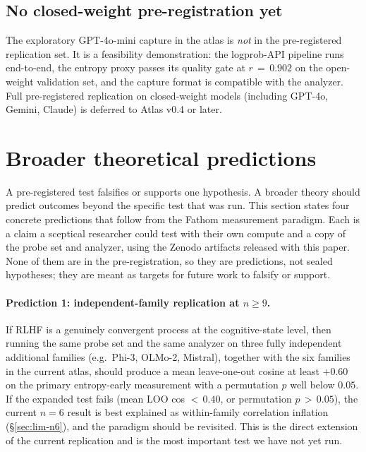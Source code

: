\documentclass[11pt,letterpaper]{article}
\begin{document}
\subsection{No closed-weight pre-registration yet}

The exploratory GPT-4o-mini capture in the atlas is \emph{not} in the
pre-registered replication set. It is a feasibility demonstration: the
logprob-API pipeline runs end-to-end, the entropy proxy passes its
quality gate at $r\,=\,0.902$ on the open-weight validation set, and the
capture format is compatible with the analyzer. Full pre-registered
replication on closed-weight models (including GPT-4o, Gemini, Claude)
is deferred to Atlas v0.4 or later.

\section{Broader theoretical predictions}
\label{sec:predictions}

A pre-registered test falsifies or supports one hypothesis. A broader
theory should predict outcomes beyond the specific test that was run.
This section states four concrete predictions that follow from the
Fathom measurement paradigm. Each is a claim a sceptical researcher
could test with their own compute and a copy of the probe set and
analyzer, using the Zenodo artifacts released with this paper. None of
them are in the pre-registration, so they are predictions, not sealed
hypotheses; they are meant as targets for future work to falsify or
support.

\paragraph{Prediction 1: independent-family replication at $n\!\geq\!9$.}
If RLHF is a genuinely convergent process at the cognitive-state level,
then running the same probe set and the same analyzer on three fully
independent additional families (e.g.\ Phi-3, OLMo-2, Mistral), together
with the six families in the current atlas, should produce a mean
leave-one-out cosine at least $+0.60$ on the primary entropy-early
measurement with a permutation $p$ well below $0.05$. If the expanded
test fails (mean LOO cos $<\,0.40$, or permutation $p\,>\,0.05$), the
current $n\!=\!6$ result is best explained as within-family correlation
inflation (\S\ref{sec:lim-n6}), and the paradigm should be revisited.
This is the direct extension of the current replication and is the most
important test we have not yet run.
\end{document}
